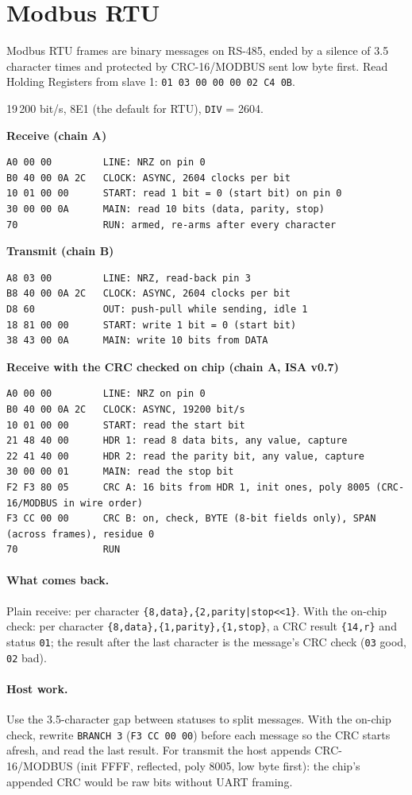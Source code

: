 \documentclass[11pt,a4paper]{article}
\newcommand{\sig}[1]{\texttt{#1}}
\newcommand{\progtitle}[1]{\par\smallskip\textbf{\small\color{accent}#1}\par\nopagebreak}
\newcommand{\facts}[1]{\par\noindent\colorbox{codebg}{\parbox{\dimexpr\linewidth-2\fboxsep}{\small #1}}\par}
\begin{document}
\section{Modbus RTU}
Modbus RTU frames are binary messages on RS-485, ended by a silence of 3.5 character times and protected by CRC-16/MODBUS sent low byte first. Read Holding Registers from slave 1: \texttt{01 03 00 00 00 02 C4 0B}.
\facts{19\,200 bit/s, 8E1 (the default for RTU), \sig{DIV} = 2604.}
\progtitle{Receive (chain A)}
\begin{lstlisting}
A0 00 00         LINE: NRZ on pin 0
B0 40 00 0A 2C   CLOCK: ASYNC, 2604 clocks per bit
10 01 00 00      START: read 1 bit = 0 (start bit) on pin 0
30 00 00 0A      MAIN: read 10 bits (data, parity, stop)
70               RUN: armed, re-arms after every character
\end{lstlisting}
\progtitle{Transmit (chain B)}
\begin{lstlisting}
A8 03 00         LINE: NRZ, read-back pin 3
B8 40 00 0A 2C   CLOCK: ASYNC, 2604 clocks per bit
D8 60            OUT: push-pull while sending, idle 1
18 81 00 00      START: write 1 bit = 0 (start bit)
38 43 00 0A      MAIN: write 10 bits from DATA
\end{lstlisting}
\progtitle{Receive with the CRC checked on chip (chain A, ISA v0.7)}
\begin{lstlisting}
A0 00 00         LINE: NRZ on pin 0
B0 40 00 0A 2C   CLOCK: ASYNC, 19200 bit/s
10 01 00 00      START: read the start bit
21 48 40 00      HDR 1: read 8 data bits, any value, capture
22 41 40 00      HDR 2: read the parity bit, any value, capture
30 00 00 01      MAIN: read the stop bit
F2 F3 80 05      CRC A: 16 bits from HDR 1, init ones, poly 8005 (CRC-16/MODBUS in wire order)
F3 CC 00 00      CRC B: on, check, BYTE (8-bit fields only), SPAN (across frames), residue 0
70               RUN
\end{lstlisting}
\paragraph{What comes back.} Plain receive: per character \texttt{\{8,data\},\{2,parity|stop<<1\}}. With the on-chip check: per character \texttt{\{8,data\},\{1,parity\},\{1,stop\}}, a CRC result \texttt{\{14,r\}} and status \texttt{01}; the result after the last character is the message's CRC check (\texttt{03} good, \texttt{02} bad).

\paragraph{Host work.} Use the 3.5-character gap between statuses to split messages. With the on-chip check, rewrite \sig{BRANCH 3} (\texttt{F3 CC 00 00}) before each message so the CRC starts afresh, and read the last result. For transmit the host appends CRC-16/MODBUS (init FFFF, reflected, poly 8005, low byte first): the chip's appended CRC would be raw bits without UART framing.
\end{document}
